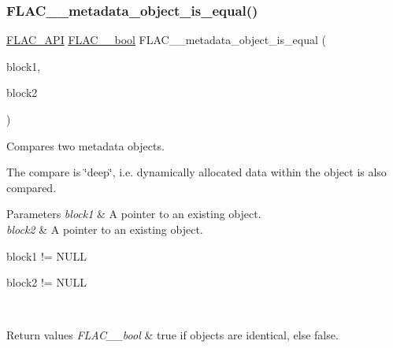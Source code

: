 \subsubsection{\texorpdfstring{F\+L\+A\+C\+\_\+\+\_\+metadata\+\_\+object\+\_\+is\+\_\+equal()}{FLAC\_\_metadata\_object\_is\_equal()}}
{\footnotesize\ttfamily \hyperlink{group__flac__export_ga56ca07df8a23310707732b1c0007d6f5}{F\+L\+A\+C\+\_\+\+A\+PI} \hyperlink{ordinals_8h_a95103469f1cbd78b8cf250194985b34e}{F\+L\+A\+C\+\_\+\+\_\+bool} F\+L\+A\+C\+\_\+\+\_\+metadata\+\_\+object\+\_\+is\+\_\+equal (\begin{DoxyParamCaption}\item[{\hyperlink{zconf_8h_a2c212835823e3c54a8ab6d95c652660e}{const} \hyperlink{struct_f_l_a_c_____stream_metadata}{F\+L\+A\+C\+\_\+\+\_\+\+Stream\+Metadata} $\ast$}]{block1,  }\item[{\hyperlink{zconf_8h_a2c212835823e3c54a8ab6d95c652660e}{const} \hyperlink{struct_f_l_a_c_____stream_metadata}{F\+L\+A\+C\+\_\+\+\_\+\+Stream\+Metadata} $\ast$}]{block2 }\end{DoxyParamCaption})}

Compares two metadata objects.

The compare is \char`\"{}deep\char`\"{}, i.\+e. dynamically allocated data within the object is also compared.


\begin{DoxyParams}{Parameters}
{\em block1} & A pointer to an existing object. \\
\hline
{\em block2} & A pointer to an existing object.  
\begin{DoxyCode}
block1 != NULL 
\end{DoxyCode}
 
\begin{DoxyCode}
block2 != NULL 
\end{DoxyCode}
 \\
\hline
\end{DoxyParams}

\begin{DoxyRetVals}{Return values}
{\em F\+L\+A\+C\+\_\+\+\_\+bool} & {\ttfamily true} if objects are identical, else {\ttfamily false}. \\
\hline
\end{DoxyRetVals}
\mbox{\label{group__flac__metadata__object_ga0d21a62648d8c5321b4b47f8ee5a52f0}} 
